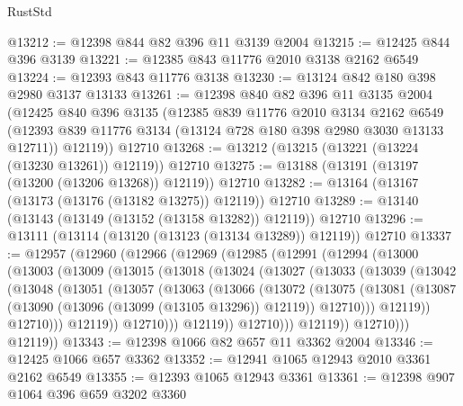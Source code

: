 \begin{lexlean}{RustStd}
\begin{coremodule}
@13212 := @12398 @844 @82 @396 @11 @3139 @2004
@13215 := @12425 @844 @396 @3139
@13221 := @12385 @843 @11776 @2010 @3138 @2162 @6549
@13224 := @12393 @843 @11776 @3138
@13230 := @13124 @842 @180 @398 @2980 @3137 @13133
@13261 := @12398
    @840
    @82
    @396
    @11
    @3135
    @2004
    (@12425
      @840
      @396
      @3135
      (@12385
        @839
        @11776
        @2010
        @3134
        @2162
        @6549
        (@12393 @839 @11776 @3134 (@13124 @728 @180 @398 @2980 @3030 @13133 @12711))
        @12119))
    @12710
@13268 := @13212 (@13215 (@13221 (@13224 (@13230 @13261)) @12119)) @12710
@13275 := @13188 (@13191 (@13197 (@13200 (@13206 @13268)) @12119)) @12710
@13282 := @13164 (@13167 (@13173 (@13176 (@13182 @13275)) @12119)) @12710
@13289 := @13140 (@13143 (@13149 (@13152 (@13158 @13282)) @12119)) @12710
@13296 := @13111 (@13114 (@13120 (@13123 (@13134 @13289)) @12119)) @12710
@13337 := @12957
    (@12960
      (@12966
        (@12969
          (@12985
            (@12991
              (@12994
                (@13000
                  (@13003
                    (@13009
                      (@13015
                        (@13018
                          (@13024
                            (@13027
                              (@13033
                                (@13039
                                  (@13042
                                    (@13048
                                      (@13051
                                        (@13057
                                          (@13063
                                            (@13066
                                              (@13072
                                                (@13075
                                                  (@13081
                                                    (@13087
                                                      (@13090
                                                        (@13096 (@13099 (@13105 @13296)) @12119))
                                                      @12710)))
                                                @12119))
                                            @12710)))
                                      @12119))
                                  @12710)))
                            @12119))
                        @12710)))
                  @12119))
              @12710)))
        @12119))
@13343 := @12398 @1066 @82 @657 @11 @3362 @2004
@13346 := @12425 @1066 @657 @3362
@13352 := @12941 @1065 @12943 @2010 @3361 @2162 @6549
@13355 := @12393 @1065 @12943 @3361
@13361 := @12398 @907 @1064 @396 @659 @3202 @3360

\end{coremodule}
\end{lexlean}
